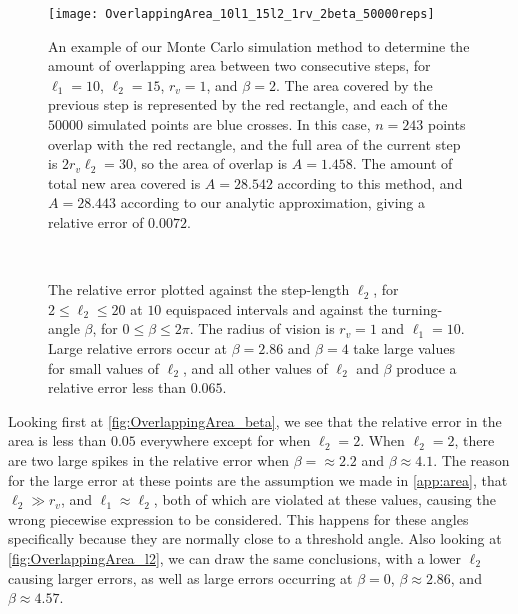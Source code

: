 \begin{figure}[h!]
	\centering
	\texttt{[image: OverlappingArea\_10l1\_15l2\_1rv\_2beta\_50000reps]}
	\caption[An example step where the overlapping area is approximated using a Monte Carlo simulation, and compared with our analytic expressions]{An example of our Monte Carlo simulation method to determine the amount of overlapping area between two consecutive steps, for $\ell_1=10$, $\ell_2 = 15$, $r_v=1$, and $\beta=2$. The area covered by the previous step is represented by the red rectangle, and each of the $50000$ simulated points are blue crosses. In this case, $n=243$ points overlap with the red rectangle, and the full area of the current step is $2r_v\ell_2 = 30$, so the area of overlap is $A=1.458$. The amount of total new area covered is $A=28.542$ according to this method, and $A=28.443$ according to our analytic approximation, giving a relative error of $0.0072$. \label{fig:OverlappingArea_example}}
\end{figure}

\begin{figure}[h!]
	\centering
	\hfill
	\\
	\caption[The relative error in our analytic expressions for the overlap plotted against the step-length and the turning-angle]{The relative error plotted against the step-length $\ell_2$, for $2 \leq \ell_2 \leq 20$ at $10$ equispaced intervals and against the turning-angle $\beta$, for $0 \leq \beta \leq 2 \pi$.  The radius of vision is $r_v=1$ and $\ell_1 = 10$. Large relative errors occur at $\beta=2.86$ and $\beta=4$ take large values for small values of $\ell_2$, and all other values of $\ell_2$ and $\beta$ produce a relative error less than $0.065$.}\label{fig:OverlappingArea}
\end{figure}

Looking first at \cref{fig:OverlappingArea_beta}, we see that the relative error in the area is less than $0.05$ everywhere except for when $\ell_2 = 2$. When $\ell_2=2$, there are two large spikes in the relative error when $\beta = \approx 2.2$ and $\beta \approx 4.1$. The reason for the large error at these points are the assumption we made in \cref{app:area}, that $\ell_2 \gg r_v$, and $\ell_1 \approx \ell_2$, both of which are violated at these values, causing the wrong piecewise expression to be considered. This happens for these angles specifically because they are normally close to a threshold angle. Also looking at \cref{fig:OverlappingArea_l2}, we can draw the same conclusions, with a lower $\ell_2$ causing larger errors, as well as large errors occurring at $\beta = 0$, $\beta\approx 2.86$, and $\beta \approx 4.57$.

